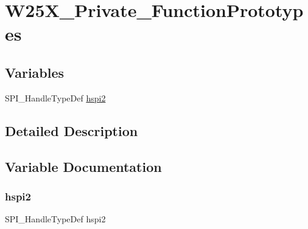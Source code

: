 \hypertarget{group___w25_x___private___function_prototypes}{}\section{W25\+X\+\_\+\+Private\+\_\+\+Function\+Prototypes}
\label{group___w25_x___private___function_prototypes}
\subsection*{Variables}
\begin{DoxyCompactItemize}
\item 
S\+P\+I\+\_\+\+Handle\+Type\+Def \mbox{\hyperlink{group___w25_x___private___function_prototypes_gab9da65f935e805137e2eb4e18c5ab224}{hspi2}}
\end{DoxyCompactItemize}


\subsection{Detailed Description}


\subsection{Variable Documentation}
\mbox{\label{group___w25_x___private___function_prototypes_gab9da65f935e805137e2eb4e18c5ab224}} 
\subsubsection{\texorpdfstring{hspi2}{hspi2}}
{\footnotesize\ttfamily S\+P\+I\+\_\+\+Handle\+Type\+Def hspi2}

